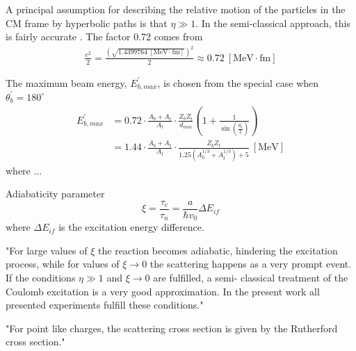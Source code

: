 \documentclass[twoside,english]{uiofysmaster/uiofysmaster}
\begin{document}
A principal assumption for describing the relative motion of the particles in the CM frame by hyperbolic paths is that $\eta \gg 1$.
In the semi-classical approach, this is fairly accurate \cite{Cline1969}. 
The factor 0.72 comes from 
\begin{align}
	\frac{e^2}{2} = \frac{(\sqrt{1.4399764 ~[\text{MeV} \cdot \text{fm}]})^2}{2} \approx 0.72 ~[\text{MeV} \cdot \text{fm}]
\end{align}




The maximum beam energy, $E_{b, max}^{'}$, is chosen from the special case when $\theta_b^{'} = 180^\circ$
\begin{align}
	E_{b, max}^{'} &= 0.72 \cdot \frac{A_b + A_t}{A_t} \cdot \frac{Z_b Z_t}{d_{min}} \left( 1 + \frac{1}{\sin \left( \frac{\theta_b^{'}}{2} \right)} \right) \nonumber \\
	&= 1.44 \cdot \frac{A_b + A_t}{A_t} \cdot \frac{Z_b Z_t}{1.25 (A_b^{1/3} + A_t^{1/3}) + 5} ~[\text{MeV}]
\end{align}
where ...
\cite{Klintefjord}



\bigskip

Adiabaticity parameter \cite{Niedermaier}
\begin{equation}
	\xi = \frac{\tau_c}{\tau_n} = \frac{a}{\hbar v_0}  \Delta E_{if}
\end{equation}
where $\Delta E_{if}$ is the excitation energy difference.

"For large values of $\xi$ the reaction becomes adiabatic, hindering the excitation process, while for values of $\xi \rightarrow 0$ the scattering happens as a very prompt event. If the conditions $\eta \gg 1$ and $\xi \rightarrow 0$ are fulfilled, a semi- classical treatment of the Coulomb excitation is a very good approximation. In the present work all presented experiments fulfill these conditions."

\bigskip

"For point like charges, the scattering cross section is given by the Rutherford cross section."
\end{document}
